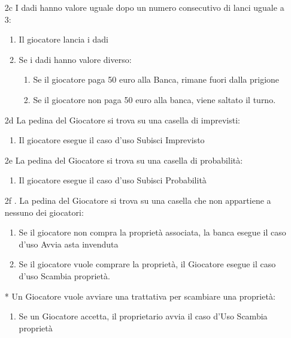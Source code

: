 \documentclass{article}
\begin{document}
\begin{itemize}
\begin{enumerate}
    \item [2c] I dadi hanno valore uguale dopo un numero consecutivo di lanci uguale a 3:
    \begin{enumerate}
        \item Il giocatore lancia i dadi
        \item Se i dadi hanno valore diverso:
        \begin{enumerate}
            \item Se il giocatore paga 50 euro alla Banca, rimane fuori dalla prigione
            \item Se il giocatore non paga 50 euro alla banca, viene saltato il turno.
        \end{enumerate}
    \end{enumerate}
    \item [2d] La pedina del Giocatore si trova su una casella di imprevisti:
    \begin{enumerate}
        \item Il giocatore esegue il caso d'uso Subisci Imprevisto
    \end{enumerate}
    \item [2e] La pedina del Giocatore si trova su una casella di probabilità:
    \begin{enumerate}
        \item Il giocatore esegue il caso d'uso Subisci Probabilità
    \end{enumerate}
    \item [2f]. La pedina del Giocatore si trova su una casella che non appartiene a nessuno dei giocatori:
    \begin{enumerate}
        \item Se il giocatore non compra la proprietà associata, la banca esegue il caso d'uso Avvia asta invenduta
        \item Se il giocatore vuole comprare la proprietà, il Giocatore esegue il caso d'uso Scambia proprietà.
    \end{enumerate}
    \item [*] Un Giocatore vuole avviare una trattativa per scambiare una proprietà:
    \begin{enumerate}
        \item Se un Giocatore accetta, il proprietario avvia il caso d'Uso Scambia proprietà 
    \end{enumerate}
\end{enumerate}
\end{itemize}
\end{document}
